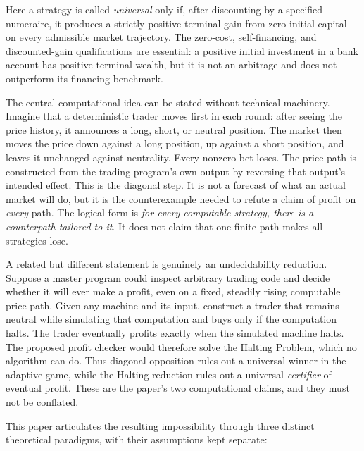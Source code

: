\documentclass[aps,pra,reprint,superscriptaddress,amsmath,amssymb,floatfix]{revtex4-2}
\theoremstyle{plain}
\theoremstyle{definition}
\theoremstyle{remark}
\begin{document}
Here a strategy is called \emph{universal} only if, after discounting by a
specified numeraire, it produces a strictly positive terminal gain from zero
initial capital on every admissible market trajectory. The zero-cost,
self-financing, and discounted-gain qualifications are essential: a positive
initial investment in a bank account has positive terminal wealth, but it is
not an arbitrage and does not outperform its financing benchmark.

The central computational idea can be stated without technical machinery.
Imagine that a deterministic trader moves first in each round: after seeing
the price history, it announces a long, short, or neutral position. The market
then moves the price down against a long position, up against a short position,
and leaves it unchanged against neutrality. Every nonzero bet loses. The price
path is constructed from the trading program's own output by reversing that
output's intended effect. This is the diagonal step. It is not a forecast of
what an actual market will do, but it is the counterexample needed to refute a
claim of profit on \emph{every} path. The logical form is
\emph{for every computable strategy, there is a counterpath tailored to it}.
It does not claim that one finite path makes all strategies lose.

A related but different statement is genuinely an undecidability reduction.
Suppose a master program could inspect arbitrary trading code and decide
whether it will ever make a profit, even on a fixed, steadily rising computable
price path. Given any machine and its input, construct a trader that remains
neutral while simulating that computation and buys only if the computation
halts. The trader eventually profits exactly when the simulated machine
halts. The proposed profit checker would therefore solve the Halting Problem,
which no algorithm can do. Thus diagonal opposition rules out a universal
winner in the adaptive game, while the Halting reduction rules out a universal
\emph{certifier} of eventual profit. These are the paper's two computational
claims, and they must not be conflated.

This paper articulates the resulting impossibility through three distinct
theoretical paradigms, with their assumptions kept separate:
\end{document}
